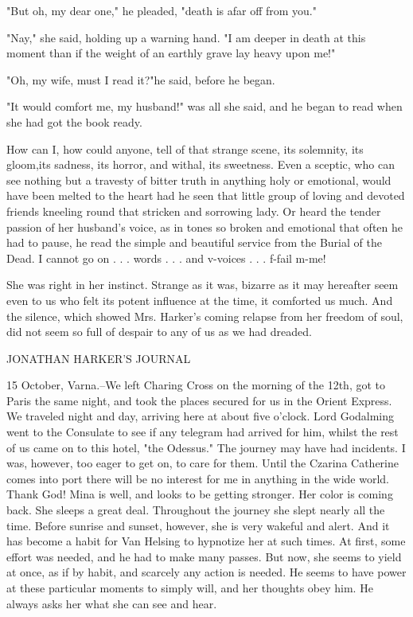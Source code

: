 "But oh, my dear one," he pleaded, "death is afar off from you." 

"Nay," she said, holding up a warning hand. "I am deeper in death at this moment than if the weight of an earthly grave lay heavy upon me!" 

"Oh, my wife, must I read it?"he said, before he began. 

"It would comfort me, my husband!" was all she said, and he began to read when she had got the book ready. 

How can I, how could anyone, tell of that strange scene, its solemnity, its gloom,its sadness, its horror, and withal, its sweetness. Even a sceptic, who can see nothing but a travesty of bitter truth in anything holy or emotional, would have been melted to the heart had he seen that little group of loving and devoted friends kneeling round that stricken and sorrowing lady. Or heard the tender passion of her husband's voice, as in tones so broken and emotional that often he had to pause, he read the simple and beautiful service from the Burial of the Dead. I cannot go on . . . words . . . and v-voices . . . f-fail m-me! 

She was right in her instinct. Strange as it was, bizarre as it may hereafter seem even to us who felt its potent influence at the time, it comforted us much. And the silence, which showed Mrs. Harker's coming relapse from her freedom of soul, did not seem so full of despair to any of us as we had dreaded. 

JONATHAN HARKER'S JOURNAL 

15 October, Varna.--We left Charing Cross on the morning of the 12th, got to Paris the same night, and took the places secured for us in the Orient Express. We traveled night and day, arriving here at about five o'clock. Lord Godalming went to the Consulate to see if any telegram had arrived for him, whilst the rest of us came on to this hotel, "the Odessus." The journey may have had incidents. I was, however, too eager to get on, to care for them. Until the Czarina Catherine comes into port there will be no interest for me in anything in the wide world. Thank God! Mina is well, and looks to be getting stronger. Her color is coming back. She sleeps a great deal. Throughout the journey she slept nearly all the time. Before sunrise and sunset, however, she is very wakeful and alert. And it has become a habit for Van Helsing to hypnotize her at such times. At first, some effort was needed, and he had to make many passes. But now, she seems to yield at once, as if by habit, and scarcely any action is needed. He seems to have power at these particular moments to simply will, and her thoughts obey him. He always asks her what she can see and hear. 

